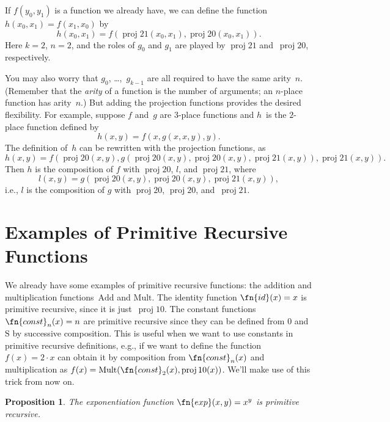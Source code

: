 \documentclass[10pt,a4paper]{article}
\theoremstyle{plain}
\newtheorem{prop}[thm]{Proposition}
\theoremstyle{definition}
\theoremstyle{remark}
\newcommand*{\olfileid}[3]{}
\newcommand*{\olsection}[1]{\section*{#1}}
\providecommand{\Mult}{\ensuremath{\mathrm{Mult}}}
\providecommand{\Add}{\ensuremath{\mathrm{Add}}}
\providecommand{\Zero}{\ensuremath{0}}
\providecommand{\Succ}{\ensuremath{\mathrm{S}}}
\providecommand{\Proj}{\operatorname{proj}}
\begin{document}
If $f(y_0, y_1)$ is a function we already have, we can define the
function $h(x_0, x_1) = f(x_1, x_0)$ by
\[
h(x_0, x_1) = f(\Proj{2}{1}(x_0, x_1),\Proj{2}{0}(x_0, x_1)).
\]
Here $k=2$, $n = 2$, and the roles of $g_0$ and $g_1$ are played by
$\Proj{2}{1}$ and~$\Proj{2}{0}$, respectively.

You may also worry that $g_0$, \dots,~$g_{k-1}$ are all required
to have the same arity~$n$. (Remember that the \emph{arity} of a
function is the number of arguments; an $n$-place function has
arity~$n$.) But adding the projection functions provides the desired
flexibility. For example, suppose $f$ and~$g$ are $3$-place functions
and $h$~is the $2$-place function defined by
\[
h(x,y) = f(x,g(x,x,y),y).
\]
The definition of~$h$ can be rewritten with the projection
functions, as
\[
h(x,y) = f(\Proj{2}{0}(x,y), g(\Proj{2}{0}(x,y), \Proj{2}{0}(x,y),
\Proj{2}{1}(x,y)), \Proj{2}{1}(x,y)).
\]
Then $h$ is the composition of $f$ with $\Proj{2}{0}$, $l$, and
$\Proj{2}{1}$, where
\[
l(x,y) = g(\Proj{2}{0}(x,y),\Proj{2}{0}(x,y),\Proj{2}{1}(x,y)),
\]
i.e., $l$ is the composition of $g$ with $\Proj{2}{0}$, $\Proj{2}{0}$,
and~$\Proj{2}{1}$.





\olfileid{cmp}{rec}{exa}
\olsection{Examples of Primitive Recursive Functions}


We already have some examples of primitive recursive functions: the
addition and multiplication functions~$\Add$ and $\Mult$.  The
identity function $\fn{id}(x) = x$ is primitive recursive, since it is
just~$\Proj{1}{0}$. The constant functions $\fn{const}_n(x) = n$ are
primitive recursive since they can be defined from $\Zero$ and $\Succ$
by successive composition. This is useful when we want to use
constants in primitive recursive definitions, e.g., if we want to
define the function $f(x) = 2 \cdot x$ can obtain it by composition
from $\fn{const}_n(x)$ and multiplication as $f(x) =
\Mult(\fn{const}_2(x), \Proj{1}{0}(x))$. We'll make use of this trick
from now on.

\begin{prop}
  The exponentiation function $\fn{exp}(x, y) = x^y$ is primitive recursive.
\end{prop}
\end{document}
